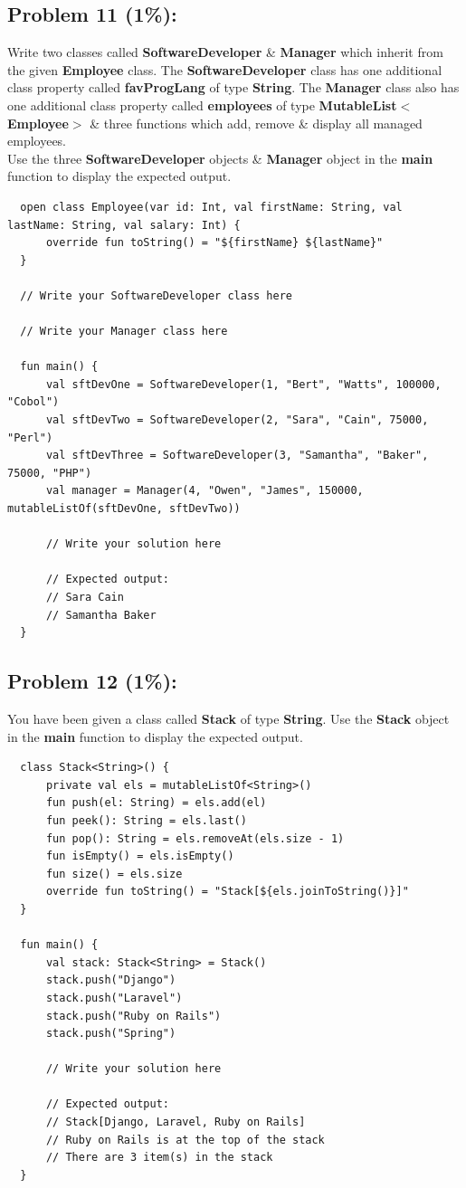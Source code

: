 \documentclass{article}
\begin{document}
\subsection*{Problem 11 (1\%):}
Write two classes called \textbf{SoftwareDeveloper} \& \textbf{Manager} which inherit from the given \textbf{Employee} class. The \textbf{SoftwareDeveloper} class has one additional class property called \textbf{favProgLang} of type \textbf{String}. The \textbf{Manager} class also has one additional class property called \textbf{employees} of type \textbf{MutableList$<$Employee$>$} \& three functions which add, remove \& display all managed employees. \\

Use the three \textbf{SoftwareDeveloper} objects \& \textbf{Manager} object in the \textbf{main} function to display the expected output.

\begin{verbatim}
  open class Employee(var id: Int, val firstName: String, val lastName: String, val salary: Int) {
      override fun toString() = "${firstName} ${lastName}"
  }

  // Write your SoftwareDeveloper class here

  // Write your Manager class here

  fun main() {
      val sftDevOne = SoftwareDeveloper(1, "Bert", "Watts", 100000, "Cobol")
      val sftDevTwo = SoftwareDeveloper(2, "Sara", "Cain", 75000, "Perl")
      val sftDevThree = SoftwareDeveloper(3, "Samantha", "Baker", 75000, "PHP")
      val manager = Manager(4, "Owen", "James", 150000, mutableListOf(sftDevOne, sftDevTwo))

      // Write your solution here

      // Expected output:
      // Sara Cain
      // Samantha Baker
  }
\end{verbatim}

\subsection*{Problem 12 (1\%):}
You have been given a class called \textbf{Stack} of type \textbf{String}. Use the \textbf{Stack} object in the \textbf{main} function to display the expected output.

\begin{verbatim}
  class Stack<String>() {
      private val els = mutableListOf<String>()
      fun push(el: String) = els.add(el)
      fun peek(): String = els.last()
      fun pop(): String = els.removeAt(els.size - 1)
      fun isEmpty() = els.isEmpty()
      fun size() = els.size
      override fun toString() = "Stack[${els.joinToString()}]"
  }

  fun main() {
      val stack: Stack<String> = Stack()
      stack.push("Django")
      stack.push("Laravel")
      stack.push("Ruby on Rails")
      stack.push("Spring")

      // Write your solution here

      // Expected output:
      // Stack[Django, Laravel, Ruby on Rails]
      // Ruby on Rails is at the top of the stack
      // There are 3 item(s) in the stack
  }
\end{verbatim}
\end{document}
